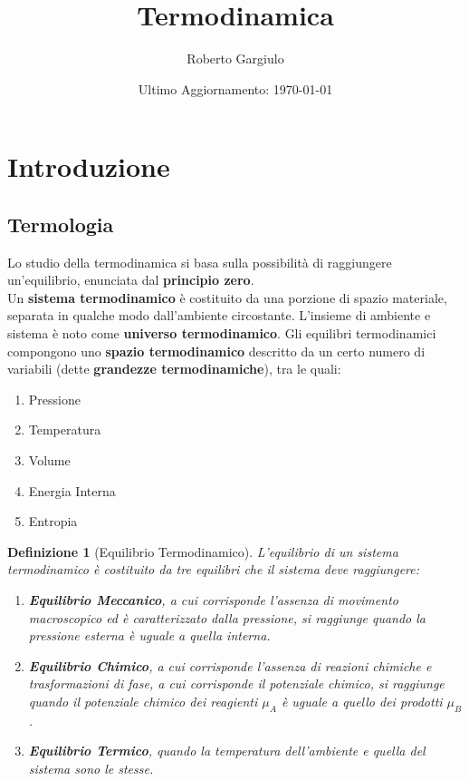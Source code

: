 \documentclass{article}
\title{Termodinamica}
\author{Roberto Gargiulo}
\date{Ultimo Aggiornamento: \today}
\newtheorem{defn}{Definizione}[section]
\begin{document}
\maketitle
\tableofcontents
\pagebreak

\section{Introduzione}
\subsection{Termologia}
Lo studio della termodinamica si basa sulla possibilità di raggiungere un'equilibrio, enunciata dal \textbf{principio zero}.\\
Un \textbf{sistema termodinamico} è costituito da una porzione di spazio materiale, separata in qualche modo dall'ambiente circostante. L'insieme di ambiente e sistema è noto come \textbf{universo termodinamico}.
Gli equilibri termodinamici compongono uno \textbf{spazio termodinamico} descritto da un certo numero di variabili (dette \textbf{grandezze termodinamiche}), tra le quali:
\begin{enumerate}
    \item Pressione
    \item Temperatura
    \item Volume
    \item Energia Interna
    \item Entropia
\end{enumerate}
\begin{defn}[Equilibrio Termodinamico]
L'equilibrio di un sistema termodinamico è costituito da tre equilibri che il sistema deve raggiungere:
\begin{enumerate}
    \item \textbf{Equilibrio Meccanico}, a cui corrisponde l'assenza di movimento macroscopico ed è caratterizzato dalla pressione, si raggiunge quando la pressione esterna è uguale a quella interna.
    \item \textbf{Equilibrio Chimico}, a cui corrisponde l'assenza di reazioni chimiche e trasformazioni di fase, a cui corrisponde il potenziale chimico, si raggiunge quando il potenziale chimico dei reagienti $\mu_A$ è uguale a quello dei prodotti $\mu_B$.
    \item \textbf{Equilibrio Termico}, quando la temperatura dell'ambiente e quella del sistema sono le stesse.
\end{enumerate}
\end{defn}
\end{document}

